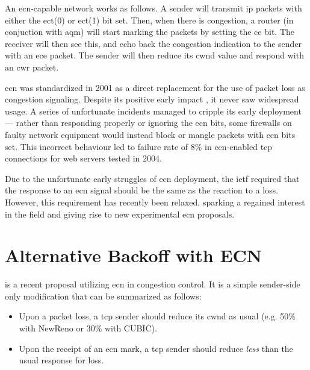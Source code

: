 An \gls{ecn}-capable network works as follows. A sender will transmit \gls{ip} packets with either the \gls{ect}(0) or \gls{ect}(1) bit set. Then, when there is congestion, a router (in conjuction with \gls{aqm}) will start marking the packets by setting the \gls{ce} bit. The receiver will then see this, and echo back the congestion indication to the sender with an \gls{ece} packet. The sender will then reduce its \gls{cwnd} value and respond with an \gls{cwr} packet.


\gls{ecn} was standardized in 2001 as a direct replacement for the use of packet loss as congestion signaling. \cite{rfc3168} Despite its positive early impact \cite{rfc2884}, it never saw widespread usage. \cite{enabling_internet-wide_ecn} A series of unfortunate incidents managed to cripple its early deployment --- rather than responding properly or ignoring the \gls{ecn} bits, some firewalls on faulty network equipment would instead block or mangle packets with \gls{ecn} bits set. This incorrect behaviour led to failure rate of 8\% in \gls{ecn}-enabled \gls{tcp} connections for web servers tested in 2004. \cite{pre-congestion_notification}

Due to the unfortunate early struggles of \gls{ecn} deployment, the \gls{ietf} required that the response to an \gls{ecn} signal should be the same as the reaction to a loss. \cite{rfc3168} However, this requirement has recently been relaxed, \cite{rfc8311} sparking  a regained interest in the field and giving rise to new experimental \gls{ecn} proposals. 






\section{Alternative Backoff with ECN}

 \cite{abe} is a recent proposal utilizing \gls{ecn} in congestion control. It is a simple sender-side only modification that can be summarized as follows:

\begin{itemize}
    \item Upon a packet loss, a \gls{tcp} sender should reduce its \gls{cwnd} as usual (e.g. 50\% with NewReno or 30\% with CUBIC).
    \item Upon the receipt of an \gls{ecn} mark, a \gls{tcp} sender should reduce \textit{less} than the usual response for loss.
\end{itemize}

